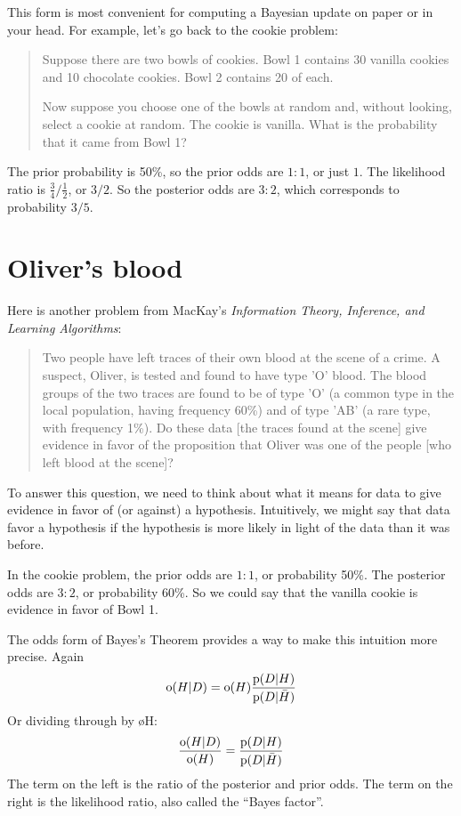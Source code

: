 \documentclass[12pt]{book}
\begin{document}
This form is most convenient for computing a Bayesian update on
paper or in your head.  For example, let's go back to the
cookie problem:

\begin{quote}
Suppose there are two bowls of cookies.  Bowl 1 contains
  30 vanilla cookies and 10 chocolate cookies.  Bowl 2 contains 20 of
  each.

Now suppose you choose one of the bowls at random and, without looking,
select a cookie at random.  The cookie is vanilla.  What is the probability
that it came from Bowl 1?
\end{quote}

The prior probability is 50\%, so the prior odds are $1:1$, or just
$1$.  The likelihood ratio is $\frac{3}{4} / \frac{1}{2}$, or $3/2$.
So the posterior odds are $3:2$, which corresponds to probability
$3/5$.


\section{Oliver's blood}
\label{oliver}

Here is another problem from MacKay's {\it Information Theory,
  Inference, and Learning Algorithms}:

\begin{quote}
Two people have left traces of their own blood at the scene of
a crime.  A suspect, Oliver, is tested and found to have type
'O' blood.  The blood groups of the two traces are found to
be of type 'O' (a common type in the local population, having frequency
60\%) and of type 'AB' (a rare type, with frequency 1\%).
Do these data [the traces found at the scene] give evidence
in favor of the proposition that Oliver was one of the people
[who left blood at the scene]?
\end{quote}

To answer this question, we need to think about what it means
for data to give evidence in favor of (or against) a hypothesis.
Intuitively, we might say that data favor a hypothesis if the
hypothesis is more likely in light of the data than it was before.

In the cookie problem, the prior odds are $1:1$, or probability 50\%.
The posterior odds are $3:2$, or probability 60\%.  So we could say
that the vanilla cookie is evidence in favor of Bowl 1.

The odds form of Bayes's Theorem provides a way to make this
intuition more precise.  Again
%
\[ \mathrm{o}(H|D) = \mathrm{o}(H) \frac{\mathrm{p}(D|H)}{\mathrm{p}(D|\bar{H})} \]
%
Or dividing through by \o{H}:
%
\[ \frac{\mathrm{o}(H|D)}{\mathrm{o}(H)} = \frac{\mathrm{p}(D|H)}{\mathrm{p}(D|\bar{H})} \]
%
The term on the left is the ratio of the posterior and prior odds.
The term on the right is the likelihood ratio, also called the ``Bayes
factor''.
\end{document}
